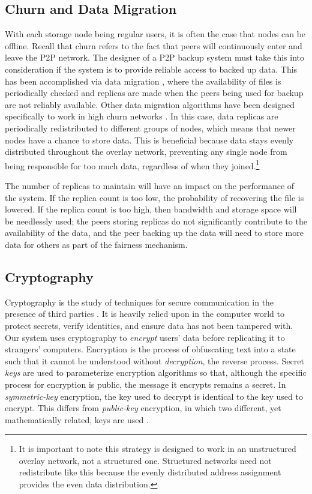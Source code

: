 \documentclass[12pt]{report}
\begin{document}
\subsection{Churn and Data Migration} \label{sec:churn}
With each storage node being regular users, it is often the case that nodes can be offline. Recall that churn refers to the fact that peers will continuously enter and leave the P2P network. The designer of a P2P backup system must take this into consideration if the system is to provide reliable access to backed up data. This has been accomplished via data migration \cite{pStore,PeerStore}, where the availability of files is periodically checked and replicas are made when the peers being used for backup are not reliably available. Other data migration algorithms have been designed specifically to work in high churn networks \cite{StorageSearchP2PNetworks}. In this case, data replicas are periodically redistributed to different groups of nodes, which means that newer nodes have a chance to store data. This is beneficial because data stays evenly distributed throughout the overlay network, preventing any single node from being responsible for too much data, regardless of when they joined.\footnote{It is important to note this strategy is designed to work in an unstructured overlay network, not a structured one. Structured networks need not redistribute like this because the evenly distributed address assignment provides the even data distribution.}

The number of replicas to maintain will have an impact on the performance of the system. If the replica count is too low, the probability of recovering the file is lowered. If the replica count is too high, then bandwidth and storage space will be needlessly used; the peers storing replicas do not significantly contribute to the availability of the data, and the peer backing up the data will need to store more data for others as part of the fairness mechanism.

\subsection{Cryptography} \label{sec:crypto}
Cryptography is the study of techniques for secure communication in the presence of third parties \cite{cryptoDef}. It is heavily relied upon in the computer world to protect secrets, verify identities, and ensure data has not been tampered with. Our system uses cryptography to \textit{encrypt} users' data before replicating it to strangers' computers. Encryption is the process of obfuscating text into a state such that it cannot be understood without \textit{decryption}, the reverse process. Secret \textit{keys} are used to parameterize encryption algorithms so that, although the specific process for encryption is public, the message it encrypts remains a secret. In \textit{symmetric-key} encryption, the key used to decrypt is identical to the key used to encrypt. This differs from \textit{public-key} encryption, in which two different, yet mathematically related, keys are used \cite{ModernCrypto}.
\end{document}

